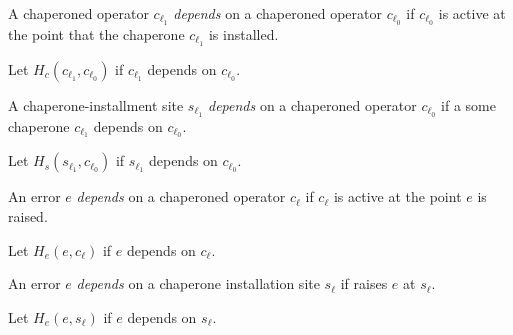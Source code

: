 
\begin{definition}
A chaperoned operator $c_{\ell_1}$ \emph{depends} on a chaperoned operator $c_{\ell_0}$ if $c_{\ell_0}$ is active at the point that the chaperone $c_{\ell_1}$ is installed.
\end{definition}

Let $H_c(c_{\ell_1},c_{\ell_0})$ if $c_{\ell_1}$ depends on $c_{\ell_0}$.

\begin{definition}
A chaperone-installment site $s_{\ell_1}$ \emph{depends} on a chaperoned operator $c_{\ell_0}$ if a some chaperone $c_{\ell_1}$ depends on $c_{\ell_0}$.
\end{definition}

Let $H_s(s_{\ell_1},c_{\ell_0})$ if $s_{\ell_1}$ depends on $c_{\ell_0}$.

\begin{definition}
An error $e$ \emph{depends} on a chaperoned operator $c_\ell$ if $c_\ell$  is active at the point $e$ is raised.
\end{definition}

Let $H_e(e,c_\ell)$ if $e$ depends on $c_\ell$.

\begin{definition}
An error $e$ \emph{depends} on a chaperone installation site $s_\ell$ if  raises $e$ at $s_\ell$.
\end{definition}

Let $H_e(e,s_\ell)$ if $e$ depends on $s_\ell$.

